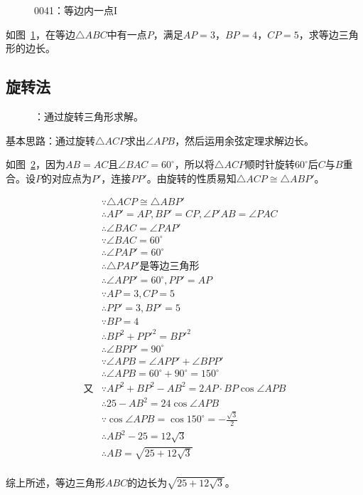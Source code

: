 

\begin{figure}[htbp]
  \centering
  \caption{0041：等边内一点I} \label{fig:0041}
\end{figure}

如图~\ref{fig:0041}，在等边$\triangle ABC$中有一点$P$，满足$AP = 3$，$BP = 4$，$CP = 5$，求等边三角形的边长。


\subsection{旋转法} \label{subsec:0041-rot}

\begin{figure}[htbp]
  \centering
  \caption{：通过旋转三角形求解。}
  \label{fig:0041-rot}
\end{figure}

基本思路：通过旋转$\triangle ACP$求出$\angle APB$，然后运用余弦定理求解边长。

如图~\ref{fig:0041-rot}，因为$AB = AC$且$\angle BAC = 60^\circ$，所以将$\triangle ACP$顺时针旋转$60^\circ$后$C$与$B$重合。设$P$的对应点为$P'$，连接$PP'$。由旋转的性质易知$\triangle ACP \cong \triangle ABP'$。

\begin{align*}
  &\because   \triangle ACP \cong \triangle ABP' \\
  &\therefore AP' = AP, BP' = CP, \angle P'AB = \angle PAC \\
  &\therefore \angle BAC = \angle PAP' \\
  &\because   \angle BAC = 60^\circ \\
  &\therefore \angle PAP' = 60^\circ \\
  &\therefore \triangle PAP'\text{是等边三角形} \\
  &\therefore \angle APP' = 60^\circ, PP' = AP \\
  &\because   AP = 3, CP = 5 \\
  &\therefore PP' = 3, BP' = 5 \\
  &\because   BP = 4 \\
  &\therefore BP^2 + PP'^2 = BP'^2 \\
  &\therefore \angle BPP' = 90^\circ \\
  &\because   \angle APB = \angle APP' + \angle BPP' \\
  &\therefore \angle APB = 60^\circ + 90^\circ = 150^\circ \\
  \text{又}&\because AP^2 + BP^2 - AB^2 = 2AP\cdot BP\cos\angle APB \\
  &\therefore 25 - AB^2 = 24\cos\angle APB \\
  &\because   \cos\angle APB = \cos 150^\circ = -\frac{\sqrt3}2 \\
  &\therefore AB^2 - 25 = 12\sqrt3 \\
  &\therefore AB = \sqrt{25 + 12\sqrt3} \\
\end{align*}

综上所述，等边三角形$ABC$的边长为$\sqrt{25 + 12\sqrt3}$。
